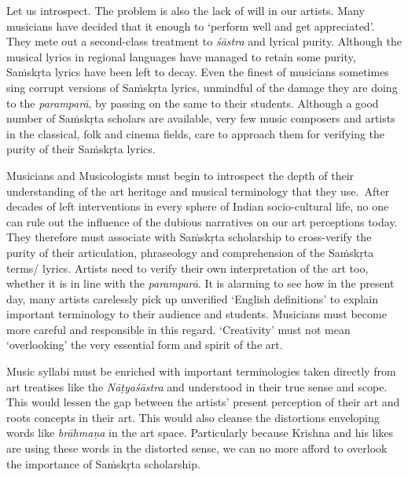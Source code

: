 Let us introspect. The problem is also the lack of will in our artists. Many musicians have decided that it enough to ‘perform well and get appreciated’. They mete out a second-class treatment to \textit{śāstra} and lyrical purity. Although the musical lyrics in regional languages have managed to retain some purity, Saṁskṛta lyrics have been left to decay. Even the finest of musicians sometimes sing corrupt versions of Saṁskṛta lyrics, unmindful of the damage they are doing to the \textit{paramparā}, by passing on the same to their students. Although a good number of Saṁskṛta scholars are available, very few music composers and artists in the classical, folk and cinema fields, care to approach them for verifying the purity of their Saṁskṛta lyrics.

Musicians and Musicologists must begin to introspect the depth of their understanding of the art heritage and musical terminology that they use.~After decades of left interventions in every sphere of Indian socio-cultural life, no one can rule out the influence of the dubious narratives on our art perceptions today. They therefore must associate with Saṁskṛta scholarship to cross-verify the purity of their articulation, phraseology and comprehension of the Saṁskṛta terms/ lyrics. Artists need to verify their own interpretation of the art too, whether it is in line with the \textit{paramparā}. It is alarming to see how in the present day, many artists carelessly pick up unverified ‘English definitions’ to explain important terminology to their audience and students. Musicians must become more careful and responsible in this regard. ‘Creativity’ must not mean ‘overlooking’ the very essential form and spirit of the art.

Music syllabi must be enriched with important terminologies taken directly from art treatises like the \textit{Nāṭyaśāstra} and understood in their true sense and scope. This would lessen the gap between the artists’ present perception of their art and roots concepts in their art. This would also cleanse the distortions enveloping words like \textit{brāhmaṇa} in the art space. Particularly because Krishna and his likes are using these words in the distorted sense, we can no more afford to overlook the importance of Saṁskṛta scholarship.

